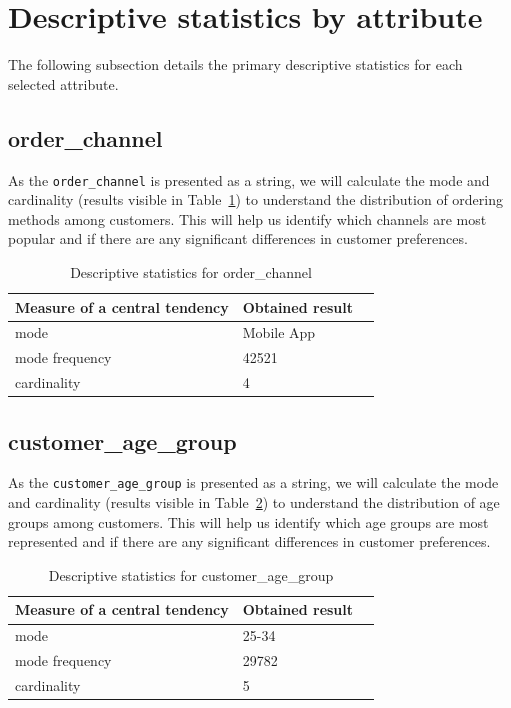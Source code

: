 \documentclass[12pt]{report}
\begin{document}
\section{Descriptive statistics by attribute}
The following subsection details the primary descriptive statistics for each selected attribute.
\subsection{order\_channel}
\noindent As the \texttt{order\_channel} is presented as a string, we will calculate the mode and cardinality (results visible in Table~\ref{tab:desc_order_channel}) to understand the distribution of ordering methods among customers. This will help us identify which channels are most popular and if there are any significant differences in customer preferences.

\begin{table}[H]

    \centering
    \begin{tabular}{|l|l|l|}
        \hline
        Measure of a central tendency & Obtained result \\ \hline
        mode                          & Mobile App           \\ \hline
        mode frequency                & 42521           \\ \hline
        cardinality                   & 4               \\ \hline
    \end{tabular}
    \caption{Descriptive statistics for order\_channel}\label{tab:desc_order_channel}
\end{table}
\subsection{customer\_age\_group}
\noindent As the \texttt{customer\_age\_group} is presented as a string, we will calculate the mode and cardinality (results visible in Table~\ref{tab:desc_customer_age_group}) to understand the distribution of age groups among customers. This will help us identify which age groups are most represented and if there are any significant differences in customer preferences.

\begin{table}[H]
    \centering
    \begin{tabular}{|l|l|l|}
        \hline
        Measure of a central tendency & Obtained result \\ \hline
        mode                          & 25-34           \\ \hline
        mode frequency                & 29782           \\ \hline
        cardinality                   & 5               \\ \hline
    \end{tabular}

    \caption{Descriptive statistics for customer\_age\_group}\label{tab:desc_customer_age_group}
\end{table}
\end{document}
